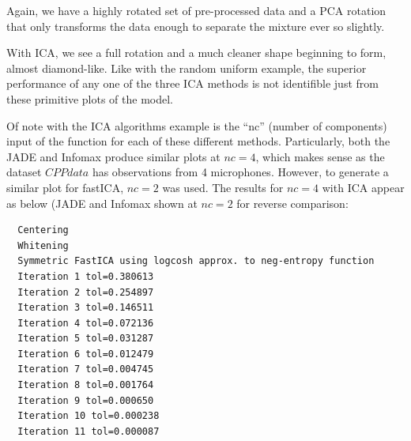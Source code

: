 \documentclass[12pt,twoside]{amherstthesis}
\begin{document}
  Again, we have a highly rotated set of pre-processed data and a PCA
  rotation that only transforms the data enough to separate the mixture
  ever so slightly.
  
  With ICA, we see a full rotation and a much cleaner shape beginning to
  form, almost diamond-like. Like with the random uniform example, the
  superior performance of any one of the three ICA methods is not
  identifible just from these primitive plots of the model.
  
  Of note with the ICA algorithms example is the ``nc'' (number of
  components) input of the function for each of these different methods.
  Particularly, both the JADE and Infomax produce similar plots at
  \(nc=4\), which makes sense as the dataset \(CPPdata\) has observations
  from 4 microphones. However, to generate a similar plot for fastICA,
  \(nc=2\) was used. The results for \(nc=4\) with ICA appear as below
  (JADE and Infomax shown at \(nc=2\) for reverse comparison:
  
  \begin{Shaded}
  \end{Shaded}
  
  \begin{verbatim}
  Centering
  Whitening
  Symmetric FastICA using logcosh approx. to neg-entropy function
  Iteration 1 tol=0.380613
  Iteration 2 tol=0.254897
  Iteration 3 tol=0.146511
  Iteration 4 tol=0.072136
  Iteration 5 tol=0.031287
  Iteration 6 tol=0.012479
  Iteration 7 tol=0.004745
  Iteration 8 tol=0.001764
  Iteration 9 tol=0.000650
  Iteration 10 tol=0.000238
  Iteration 11 tol=0.000087
  \end{verbatim}
  
\end{document}
